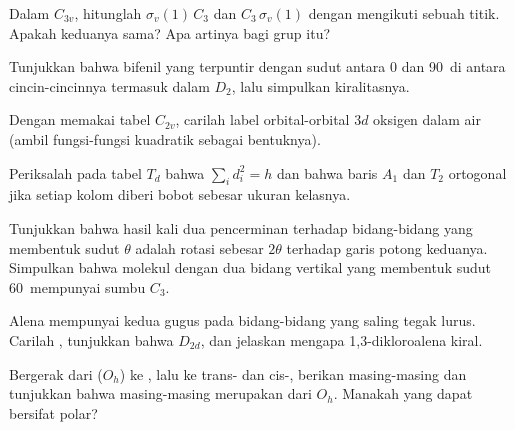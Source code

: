 \begin{exercise}[$\star\star$]\label{exo:b3:point-groups:6}
Dalam $C_{3v}$, hitunglah $\sigma_v(1)\,C_3$ dan $C_3\,\sigma_v(1)$ dengan
mengikuti sebuah titik. Apakah keduanya sama? Apa artinya bagi grup itu?
\end{exercise}

\begin{exercise}[$\star\star$]\label{exo:b3:point-groups:7}
Tunjukkan bahwa bifenil yang terpuntir dengan sudut antara 0 dan
90\textdegree\ di antara cincin-cincinnya termasuk dalam $D_2$, lalu
simpulkan kiralitasnya.
\end{exercise}

\begin{exercise}[$\star\star$]\label{exo:b3:point-groups:8}
Dengan memakai tabel $C_{2v}$, carilah label orbital-orbital $3d$ oksigen
dalam air (ambil fungsi-fungsi kuadratik sebagai bentuknya).
\end{exercise}

\begin{exercise}[$\star\star$]\label{exo:b3:point-groups:9}
Periksalah pada tabel $T_d$ bahwa $\sum_id_i^2 = h$ dan bahwa baris $A_1$
dan $T_2$ ortogonal jika setiap kolom diberi bobot sebesar ukuran kelasnya.
\end{exercise}

\begin{exercise}[$\star\star\star$]\label{exo:b3:point-groups:10}
Tunjukkan bahwa hasil kali dua pencerminan terhadap bidang-bidang yang
membentuk sudut $\theta$ adalah rotasi sebesar $2\theta$ terhadap garis
potong keduanya. Simpulkan bahwa molekul dengan dua bidang vertikal yang
membentuk sudut 60\textdegree\ mempunyai sumbu $C_3$.
\end{exercise}

\begin{exercise}[$\star\star\star$]\label{exo:b3:point-groups:11}
Alena  mempunyai kedua gugus  pada bidang-bidang yang
saling tegak lurus. Carilah , tunjukkan bahwa  $D_{2d}$, dan jelaskan mengapa 1,3-dikloroalena 
kiral.
\end{exercise}

\begin{exercise}[$\star\star\star$]\label{exo:b3:point-groups:12}
Bergerak dari  ($O_h$) ke , lalu ke trans- dan
cis-, berikan  masing-masing dan tunjukkan bahwa
masing-masing merupakan  dari $O_h$. Manakah yang dapat bersifat polar?
\end{exercise}

